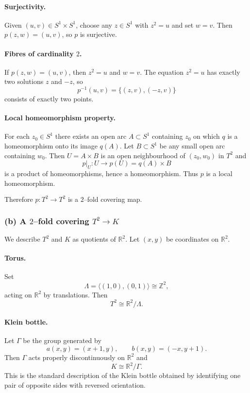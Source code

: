\documentclass[12pt,a4paper]{article}
\theoremstyle{plain}
\theoremstyle{definition}      %
\begin{document}
\paragraph{Surjectivity.}
Given $(u,v)\in S^{1}\times S^{1}$, choose any $z\in S^{1}$ with
$z^{2}=u$ and set $w=v$.  Then $p(z,w)=(u,v)$, so $p$ is surjective.

\paragraph{Fibres of cardinality $2$.}
If $p(z,w)=(u,v)$, then $z^{2}=u$ and $w=v$.
The equation $z^{2}=u$ has exactly two solutions $z$ and $-z$,
so
\[
p^{-1}(u,v) = \{(z,v),(-z,v)\}
\]
consists of exactly two points.

\paragraph{Local homeomorphism property.}
For each $z_{0}\in S^{1}$ there exists an open arc
$A\subset S^{1}$ containing $z_{0}$ on which $q$ is a homeomorphism
onto its image $q(A)$.  Let $B\subset S^{1}$ be any small open arc
containing $w_{0}$.  Then $U=A\times B$ is an open neighbourhood of
$(z_{0},w_{0})$ in $T^{2}$ and
\[
p|_{U} : U \to p(U) = q(A)\times B
\]
is a product of homeomorphisms, hence a homeomorphism.
Thus $p$ is a local homeomorphism.

Therefore $p:T^{2}\to T^{2}$ is a $2$--fold covering map.

\subsubsection*{(b) A $2$--fold covering $T^{2}\to K$}

We describe $T^{2}$ and $K$ as quotients of $\mathbb{R}^{2}$.
Let $(x,y)$ be coordinates on $\mathbb{R}^{2}$.

\paragraph{Torus.}
Set
\[
\Lambda = \langle (1,0),(0,1)\rangle \cong \mathbb{Z}^{2},
\]
acting on $\mathbb{R}^{2}$ by translations.  Then
\[
T^{2} \cong \mathbb{R}^{2}/\Lambda.
\]

\paragraph{Klein bottle.}
Let $\Gamma$ be the group generated by
\[
a(x,y) = (x+1,y), \qquad
b(x,y) = (-x,y+1).
\]
Then $\Gamma$ acts properly discontinuously on $\mathbb{R}^{2}$ and
\[
K \cong \mathbb{R}^{2}/\Gamma.
\]
This is the standard description of the Klein bottle obtained by
identifying one pair of opposite sides with reversed orientation.
\end{document}
